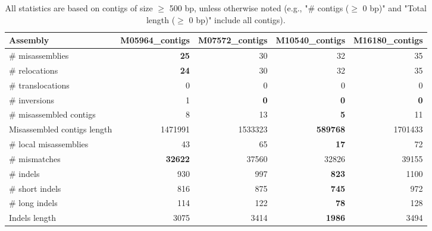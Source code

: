 \documentclass[12pt,a4paper]{article}
\begin{document}
\begin{table}[ht]
\begin{center}
\caption{All statistics are based on contigs of size $\geq$ 500 bp, unless otherwise noted (e.g., "\# contigs ($\geq$ 0 bp)" and "Total length ($\geq$ 0 bp)" include all contigs).}
\begin{tabular}{|l*{4}{|r}|}
\hline
Assembly & M05964\_contigs & M07572\_contigs & M10540\_contigs & M16180\_contigs \\ \hline
\# misassemblies & {\bf 25} & 30 & 32 & 35 \\ \hline
\hspace{5mm}\# relocations & {\bf 24} & 30 & 32 & 35 \\ \hline
\hspace{5mm}\# translocations & 0 & 0 & 0 & 0 \\ \hline
\hspace{5mm}\# inversions & 1 & {\bf 0} & {\bf 0} & {\bf 0} \\ \hline
\# misassembled contigs & 8 & 13 & {\bf 5} & 11 \\ \hline
Misassembled contigs length & 1471991 & 1533323 & {\bf 589768} & 1701433 \\ \hline
\# local misassemblies & 43 & 65 & {\bf 17} & 72 \\ \hline
\# mismatches & {\bf 32622} & 37560 & 32826 & 39155 \\ \hline
\# indels & 930 & 997 & {\bf 823} & 1100 \\ \hline
\hspace{5mm}\# short indels & 816 & 875 & {\bf 745} & 972 \\ \hline
\hspace{5mm}\# long indels & 114 & 122 & {\bf 78} & 128 \\ \hline
Indels length & 3075 & 3414 & {\bf 1986} & 3494 \\ \hline
\end{tabular}
\end{center}
\end{table}
\end{document}
